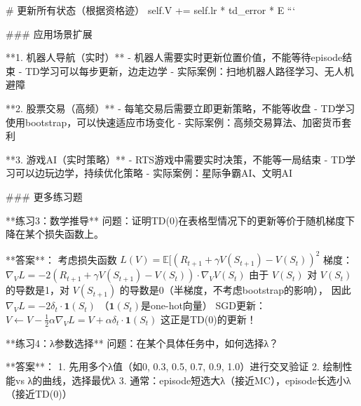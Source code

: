             # 更新所有状态（根据资格迹）
            self.V += self.lr * td_error * E
```

### 应用场景扩展

**1. 机器人导航（实时）**
- 机器人需要实时更新位置价值，不能等待episode结束
- TD学习可以每步更新，边走边学
- 实际案例：扫地机器人路径学习、无人机避障

**2. 股票交易（高频）**
- 每笔交易后需要立即更新策略，不能等收盘
- TD学习使用bootstrap，可以快速适应市场变化
- 实际案例：高频交易算法、加密货币套利

**3. 游戏AI（实时策略）**
- RTS游戏中需要实时决策，不能等一局结束
- TD学习可以边玩边学，持续优化策略
- 实际案例：星际争霸AI、文明AI

### 更多练习题

**练习3：数学推导**
问题：证明TD(0)在表格型情况下的更新等价于随机梯度下降在某个损失函数上。

**答案**：
考虑损失函数 $L(V) = \mathbb{E}[(R_{t+1} + \gamma V(S_{t+1}) - V(S_t))^2$
梯度：$\nabla_V L = -2(R_{t+1} + \gamma V(S_{t+1}) - V(S_t)) \cdot \nabla_V V(S_t)$
由于 $V(S_t)$ 对 $V(S_t)$ 的导数是1，对 $V(S_{t+1})$ 的导数是0（半梯度，不考虑bootstrap的影响），
因此 $\nabla_V L = -2\delta_t \cdot \mathbf{1}(S_t)$ （$\mathbf{1}(S_t)$是one-hot向量）
SGD更新：$V \leftarrow V - \frac{1}{2} \alpha \nabla_V L = V + \alpha \delta_t \cdot \mathbf{1}(S_t)$
这正是TD(0)的更新！

**练习4：λ参数选择**
问题：在某个具体任务中，如何选择λ？

**答案**：
1. 先用多个λ值（如0, 0.3, 0.5, 0.7, 0.9, 1.0）进行交叉验证
2. 绘制性能vs λ的曲线，选择最优λ
3. 通常：episode短选大λ（接近MC），episode长选小λ（接近TD(0)）
